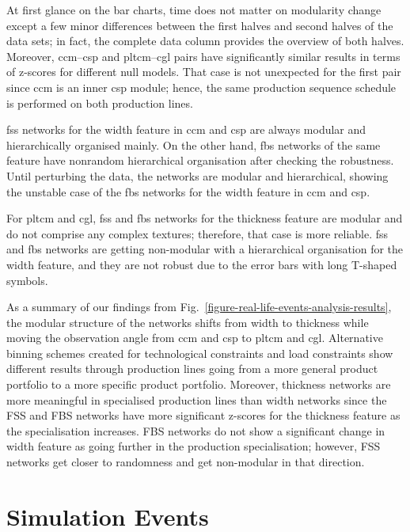 At first glance on the bar charts, time does not matter on modularity change except a few minor differences between the first halves and second halves of the data sets; in fact, the complete data column provides the overview of both halves. Moreover, \acs{ccm}--\acs{csp} and \acs{pltcm}--\acs{cgl} pairs have significantly similar results in terms of z-scores for different null models. That case is not unexpected for the first pair since \acs{ccm} is an inner \acs{csp} module; hence, the same production sequence schedule is performed on both production lines.

\acs{fss} networks for the width feature in \acs{ccm} and \acs{csp} are always modular and hierarchically organised mainly. On the other hand, \acs{fbs} networks of the same feature have nonrandom hierarchical organisation after checking the robustness. Until perturbing the data, the networks are modular and hierarchical, showing the unstable case of the \acs{fbs} networks for the width feature in \acs{ccm} and \acs{csp}.

For \acs{pltcm} and \acs{cgl}, \acs{fss} and \acs{fbs} networks for the thickness feature are modular and do not comprise any complex textures; therefore, that case is more reliable. \acs{fss} and \acs{fbs} networks are getting non-modular with a hierarchical organisation for the width feature, and they are not robust due to the error bars with long T-shaped symbols.

As a summary of our findings from Fig.~\ref{figure-real-life-events-analysis-results}, the modular structure of the networks shifts from width to thickness while moving the observation angle from \acs{ccm} and \acs{csp} to \acs{pltcm} and \acs{cgl}. Alternative binning schemes created for technological constraints and load constraints show different results through production lines going from a more general product portfolio to a more specific product portfolio. Moreover, thickness networks are more meaningful in specialised production lines than width networks since the FSS and FBS networks have more significant z-scores for the thickness feature as the specialisation increases. FBS networks do not show a significant change in width feature as going further in the production specialisation; however, FSS networks get closer to randomness and get non-modular in that direction.
\clearpage

\section{Simulation Events}

